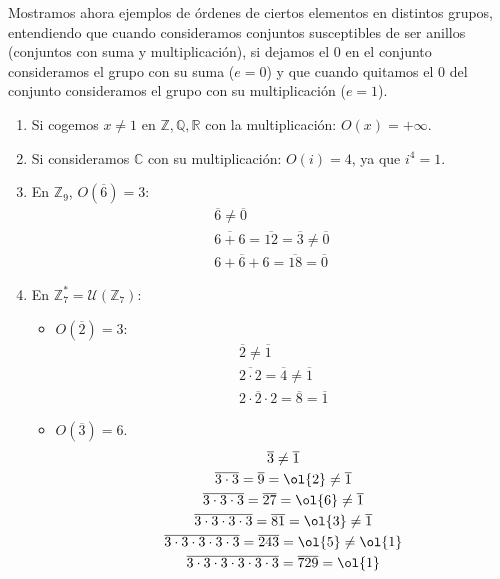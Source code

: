 \begin{ejemplo}
    Mostramos ahora ejemplos de órdenes de ciertos elementos en distintos grupos, entendiendo que cuando consideramos conjuntos susceptibles de ser anillos (conjuntos con suma y multiplicación), si dejamos el $0$ en el conjunto consideramos el grupo con su suma ($e=0$) y que cuando quitamos el $0$ del conjunto consideramos el grupo con su multiplicación ($e=1$).
    \begin{enumerate}
        \item Si cogemos $x\neq 1$ en $\mathbb{Z}, \mathbb{Q}, \mathbb{R}$ con la multiplicación: $O(x)=+\infty$.
        \item Si consideramos $\mathbb{C}$ con su multiplicación: $O(i)=4$, ya que $i^4 = 1$.
        \item En $\mathbb{Z}_9$, $O\left(\overline{6}\right) = 3$:
            \begin{gather*}
                \overline{6} \neq \overline{0} \\
                \overline{6+6} = \overline{12} = \overline{3} \neq \overline{0} \\
                \overline{6+6+6} = \overline{18} = \overline{0}
            \end{gather*}
        \item En $\mathbb{Z}_{7}^{\ast}= \mathcal{U}(\mathbb{Z}_7):$ 
            \begin{itemize}
                \item $O\left(\overline{2}\right)=3$:
                    \begin{gather*}
                        \overline{2} \neq \overline{1} \\
                        \overline{2\cdot 2} = \overline{4} \neq \overline{1} \\
                        \overline{2\cdot 2\cdot 2} = \overline{8} = \overline{1}
                    \end{gather*}
                \item $O\left(\overline{3}\right)=6$.
                \begin{gather*}
                    \overline{3} \neq \overline{1} \\
                    \overline{3\cdot 3} = \overline{9} = \ol{2} \neq \overline{1} \\
                    \overline{3\cdot 3\cdot 3} = \overline{27} = \ol{6} \neq \overline{1} \\
                    \overline{3\cdot 3\cdot 3\cdot 3} = \overline{81} = \ol{3} \neq \overline{1}\\
                    \overline{3\cdot 3\cdot 3\cdot 3\cdot 3} = \overline{243} = \ol{5} \neq \ol{1}\\
                    \overline{3\cdot 3\cdot 3\cdot 3\cdot 3\cdot 3} = \overline{729} = \ol{1}
                \end{gather*}
            \end{itemize}
    \end{enumerate}
\end{ejemplo}

